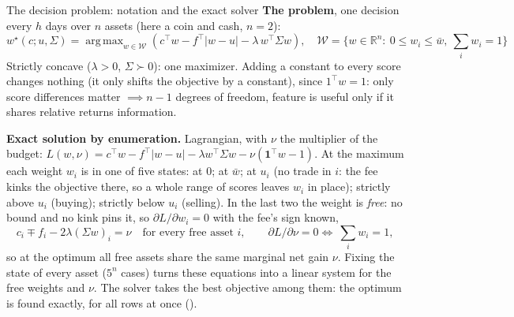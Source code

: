 \documentclass[10pt,aspectratio=169]{beamer}
\newcommand{\code}[1]{\texttt{\detokenize{#1}}}
\newcommand{\1}{\mathbf{1}}
\newcommand{\R}{\mathbb{R}}
\newcommand{\W}{\mathcal{W}}
\DeclareMathOperator*{\argmax}{arg\,max}
\begin{document}
\begin{frame}{The decision problem: notation and the exact solver}
\footnotesize
\textbf{The problem}, one decision every $h$ days over $n$ assets (here a coin and cash, $n=2$):
\[
w^\star(c;u,\Sigma)=\argmax_{w\in\W}\left(c^\top w -f^\top|w-u| - \lambda\,w^\top\Sigma w \right),
\quad \W=\{w\in\R^n:\ 0\le w_i\le\bar w,\ \textstyle\sum_iw_i=1\}
\]
Strictly concave ($\lambda>0$, $\Sigma\succ0$): one maximizer. Adding a constant to every score changes nothing (it only shifts the objective by a constant), since $1^\top w=1$: only score differences matter $\implies n-1$ degrees of freedom, feature is useful only if it shares relative returns information. \newline

\textbf{Exact solution by enumeration.} Lagrangian, with $\nu$ the multiplier of the budget: $L(w,\nu)=c^\top w-f^\top|w-u|-\lambda w^\top\Sigma w-\nu(\1^\top w-1)$. At the maximum each weight $w_i$ is in one of five states: at $0$; at $\bar w$; at $u_i$ (no trade in $i$: the fee kinks the objective there, so a whole range of scores leaves $w_i$ in place); strictly above $u_i$ (buying); strictly below $u_i$ (selling). In the last two the weight is \emph{free}: no bound and no kink pins it, so $\partial L/\partial w_i=0$ with the fee's sign known,
\[
c_i\mp f_i-2\lambda(\Sigma w)_i=\nu\quad\text{for every free asset } i,\qquad \partial L/\partial\nu=0 \iff \ \textstyle\sum_iw_i=1,
\]
so at the optimum all free assets share the same marginal net gain $\nu$. Fixing the state of every asset ($5^n$ cases) turns these equations into a linear system for the free weights and $\nu$. The solver takes the best objective among them: the optimum is found exactly, for all rows at once (\code{PortfolioOptimizer.solve}).
\end{frame}
\end{document}
